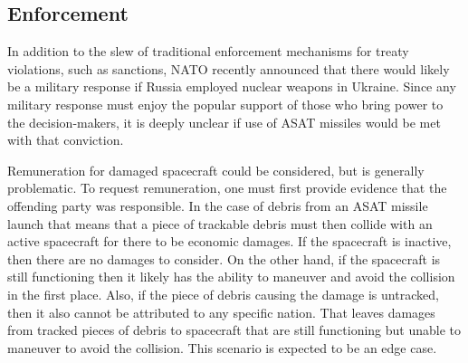 \subsection{Enforcement}
In addition to the slew of traditional enforcement mechanisms for
treaty violations, such as sanctions, NATO recently announced that
there would likely be a military response if Russia employed nuclear
weapons in Ukraine.  Since any military response must enjoy the
popular support of those who bring power to the decision-makers, it is
deeply unclear if use of ASAT missiles would be met with that
conviction.

Remuneration for damaged spacecraft could be considered, but is
generally problematic.  To request remuneration, one must first
provide evidence that the offending party was responsible.  In the
case of debris from an ASAT missile launch that means that a piece of
trackable debris must then collide with an active spacecraft for there
to be economic damages.  If the spacecraft is inactive, then there are
no damages to consider.  On the other hand, if the spacecraft is still
functioning then it likely has the ability to maneuver and avoid the
collision in the first place.  Also, if the piece of debris causing
the damage is untracked, then it also cannot be attributed to any
specific nation.  That leaves damages from tracked pieces of debris to
spacecraft that are still functioning but unable to maneuver to avoid
the collision.  This scenario is expected to be an edge case.

